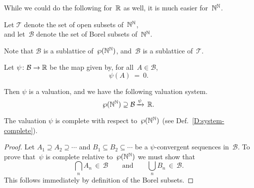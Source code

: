 \documentclass[main.tex]{subfiles}
\begin{document}
While we could do the following
for~$\mathbb{R}$ as well,
it is much easier for~$\mathbb{N}^{\mathbb{N}}$.
\begin{nt}
Let $\mathcal{T}$
denote the set of open subsets of~$\mathbb{N}^{\mathbb{N}}$, \\
and let~$\mathcal{B}$
denote the set of Borel subsets of~$\mathbb{N}^{\mathbb{N}}$.
\end{nt}
Note that $\mathcal{B}$
is a sublattice of~$\wp(\mathbb{N}^{\mathbb{N}})$,
and~$\mathcal{B}$ is a sublattice of~$\mathcal{T}$.

\begin{dfn}
Let $\psi\colon \mathcal{B}\rightarrow \mathbb{R}$
be the map given by, for all~$A\in \mathcal{B}$,
\begin{equation*}
\psi(A)\ =\ 0.
\end{equation*}
\end{dfn}
Then $\psi$ is a valuation,
and we have the following valuation system.
\begin{equation*}
\wp(\mathbb{N}^{\mathbb{N}}) \supseteq \mathcal{B}\,\smash{\xrightarrow{\psi}\,\mathbb{R}}.
\end{equation*}

\begin{lem}
The valuation $\psi$ is complete with respect to~$\wp(\mathbb{N}^{\mathbb{N}})$
(see Def.~\ref{D:system-complete}).
\end{lem}
\begin{proof}
Let $A_1 \supseteq A_2 \supseteq \dotsb$
and $B_1 \subseteq B_2 \subseteq \dotsb$
be a $\psi$-convergent sequences in~$\mathcal{B}$.
To prove that~$\psi$ is complete relative to~$\wp(\mathbb{N}^{\mathbb{N}})$
we must show that 
\begin{equation*}
\textstyle 
\bigcap_n A_n \,\in\, \mathcal{B}
\qquad\text{and}\qquad
\bigcup_n B_n \,\in\, \mathcal{B}.
\end{equation*}
This follows immediately by definition of
the Borel subsets.
\end{proof}
\end{document}
